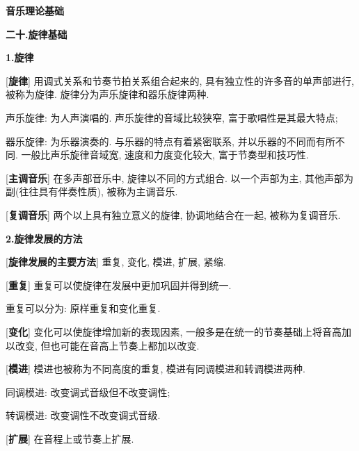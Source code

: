 

\begin{center} 
 \Large \textbf{音乐理论基础}\par
 \textbf{二十.旋律基础}
\end{center}

\large 
\begin{center}
 \textbf{1.旋律}\\
\end{center}

[\textbf{旋律}] 用调式关系和节奏节拍关系组合起来的, 具有独立性的许多音的单声部进行, 被称为旋律. 旋律分为声乐旋律和器乐旋律两种.\par
\qquad 声乐旋律: 为人声演唱的. 声乐旋律的音域比较狭窄, 富于歌唱性是其最大特点;\par
\qquad 器乐旋律: 为乐器演奏的. 与乐器的特点有着紧密联系, 并以乐器的不同而有所不同. 一般比声乐旋律音域宽, 速度和力度变化较大, 富于节奏型和技巧性.\par

[\textbf{主调音乐}] 在多声部音乐中, 旋律以不同的方式组合. 以一个声部为主, 其他声部为副(往往具有伴奏性质), 被称为主调音乐.\par

[\textbf{复调音乐}] 两个以上具有独立意义的旋律, 协调地结合在一起, 被称为复调音乐.\par

\begin{center}
 \textbf{2.旋律发展的方法}\\
\end{center}

[\textbf{旋律发展的主要方法}] 重复, 变化, 模进, 扩展, 紧缩.\par

[\textbf{重复}] 重复可以使旋律在发展中更加巩固并得到统一. \par
\qquad 重复可以分为: 原样重复和变化重复.\par

[\textbf{变化}] 变化可以使旋律增加新的表现因素, 一般多是在统一的节奏基础上将音高加以改变, 但也可能在音高上节奏上都加以改变.\par

[\textbf{模进}] 模进也被称为不同高度的重复, 模进有同调模进和转调模进两种.\par
\qquad 同调模进: 改变调式音级但不改变调性;\par
\qquad 转调模进: 改变调性不改变调式音级.\par

[\textbf{扩展}] 在音程上或节奏上扩展.\par

